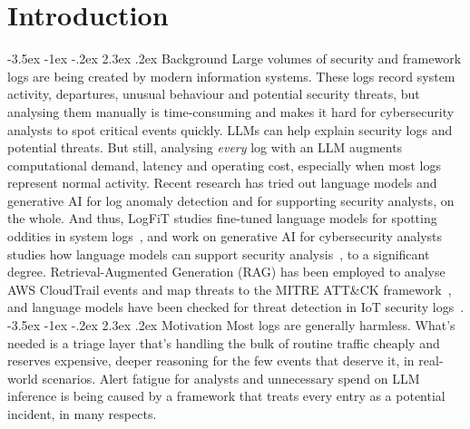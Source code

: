 \documentclass[12pt,a4paper]{report}
\makeatletter
\renewcommand\section{\@startsection {section}{1}{\z@}%
  {-3.5ex \@plus -1ex \@minus -.2ex}%
  {2.3ex \@plus .2ex}%
  {\normalfont\fontsize{17}{21}\selectfont\bfseries}}
\makeatother
\begin{document}
\tableofcontents
\listoffigures
\listoftables

\chapter{Introduction}
\section{Background}
Large volumes of security and framework logs are being created by modern information systems. These logs record system activity, departures, unusual behaviour and potential security threats, but analysing them manually is time-consuming and makes it hard for cybersecurity analysts to spot critical events quickly. LLMs can help explain security logs and potential threats. But still, analysing \emph{every} log with an LLM augments computational demand, latency and operating cost, especially when most logs represent normal activity.
Recent research has tried out language models and generative AI for log anomaly detection and for supporting security analysts, on the whole. And thus, LogFiT studies fine-tuned language models for spotting oddities in system logs~\cite{logfit}, and work on generative AI for cybersecurity analysts studies how language models can support security analysis~\cite{balogh2024}, to a significant degree. Retrieval-Augmented Generation (RAG) has been employed to analyse AWS CloudTrail events and map threats to the MITRE ATT\&CK framework~\cite{adediran2026}, and language models have been checked for threat detection in IoT security logs~\cite{tejero2025}.
\section{Motivation}
Most logs are generally harmless. What's needed is a triage layer that's handling the bulk of routine traffic cheaply and reserves expensive, deeper reasoning for the few events that deserve it, in real-world scenarios. Alert fatigue for analysts and unnecessary spend on LLM inference is being caused by a framework that treats every entry as a potential incident, in many respects.
\end{document}
